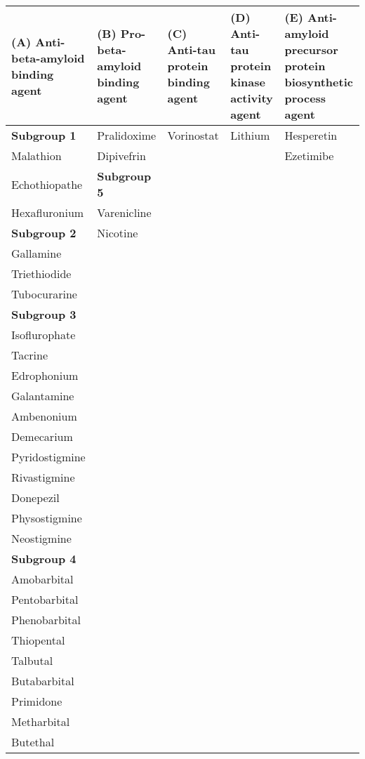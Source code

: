 \begin{table}[htbp]
\scriptsize
\begin{tabular}{|p{2.5cm}|p{2.5cm}|p{2.5cm}|p{2.5cm}|p{2.5cm}|}
\hline
\textbf{(A) Anti-beta-amyloid binding agent} & \textbf{(B) Pro-beta-amyloid binding agent} & \textbf{(C) Anti-tau protein binding agent} & \textbf{(D) Anti-tau protein kinase activity agent} & \textbf{(E) Anti-amyloid precursor protein biosynthetic process agent} \\ \hline
\textbf{Subgroup 1} & Pralidoxime & Vorinostat & Lithium & Hesperetin \\
Malathion & Dipivefrin &  &  & Ezetimibe \\
Echothiopathe & \textbf{Subgroup 5} &  &  &  \\
Hexafluronium & Varenicline &  &  &  \\
\textbf{Subgroup 2} & Nicotine &  &  &  \\ 
Gallamine &  &  &  &  \\ 
Triethiodide &  &  &  &  \\ 
Tubocurarine &  &  &  &  \\ 
\textbf{Subgroup 3} &  &  &  &  \\ 
Isoflurophate &  &  &  &  \\ 
Tacrine &  &  &  &  \\ 
Edrophonium &  &  &  &  \\ 
Galantamine &  &  &  &  \\ 
Ambenonium &  &  &  &  \\ 
Demecarium &  &  &  &  \\ 
Pyridostigmine &  &  &  &  \\ 
Rivastigmine &  &  &  &  \\ 
Donepezil &  &  &  &  \\ 
Physostigmine &  &  &  &  \\ 
Neostigmine &  &  &  &  \\ 
\textbf{Subgroup 4} &  &  &  &  \\ 
Amobarbital &  &  &  &  \\ 
Pentobarbital &  &  &  &  \\ 
Phenobarbital &  &  &  &  \\ 
Thiopental &  &  &  &  \\ 
Talbutal &  &  &  &  \\ 
Butabarbital &  &  &  &  \\ 
Primidone &  &  &  &  \\ 
Metharbital &  &  &  &  \\ 
Butethal &  &  &  &  \\ 

\end{tabular}
\end{table}
